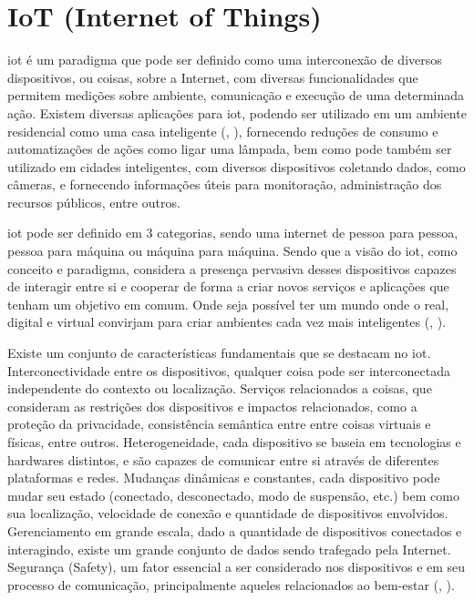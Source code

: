 \documentclass[]{politex}
\begin{document}
\section{IoT (Internet of Things)}
\acrfull{iot} é um paradigma que pode ser definido como uma interconexão de diversos dispositivos, ou coisas, sobre a Internet, com diversas funcionalidades que permitem medições sobre ambiente, comunicação e execução de uma determinada ação. Existem diversas aplicações para \acrshort{iot}, podendo ser utilizado em um ambiente residencial como uma casa inteligente (, \citeyear{iot_kelly}), fornecendo reduções de consumo e automatizações de ações como ligar uma lâmpada, bem como pode também ser utilizado em cidades inteligentes, com diversos dispositivos coletando dados, como câmeras, e fornecendo informações úteis para monitoração, administração dos recursos públicos, entre outros.

\acrshort{iot} pode ser definido em 3 categorias, sendo uma internet de pessoa para pessoa, pessoa para máquina ou máquina para máquina. Sendo que a visão do \acrshort{iot}, como conceito e paradigma, considera a presença pervasiva desses dispositivos capazes de interagir entre si e cooperar de forma a criar novos serviços e aplicações que tenham um objetivo em comum. Onde seja possível ter um mundo onde o real, digital e virtual convirjam para criar ambientes cada vez mais inteligentes (, \citeyear{iot_patel}).

Existe um conjunto de características fundamentais que se destacam no \acrshort{iot}. Interconectividade entre os dispositivos, qualquer coisa pode ser interconectada independente do contexto ou localização. Serviços relacionados a coisas,  que consideram as restrições dos dispositivos e impactos relacionados, como a proteção da privacidade,  consistência semântica entre entre coisas virtuais e físicas, entre outros. Heterogeneidade, cada dispositivo se baseia em tecnologias e hardwares distintos, e são capazes de comunicar entre si através de diferentes plataformas e redes. Mudanças dinâmicas e constantes, cada dispositivo pode mudar seu estado (conectado, desconectado, modo de suspensão, etc.) bem como sua localização, velocidade de conexão e quantidade de dispositivos envolvidos. Gerenciamento em grande escala, dado a quantidade de dispositivos conectados e interagindo, existe um grande conjunto de dados sendo trafegado pela Internet. Segurança (Safety), um fator essencial a ser considerado nos dispositivos e em seu processo de comunicação, principalmente aqueles relacionados ao bem-estar (, \citeyear{iot_patel}).
\end{document}
